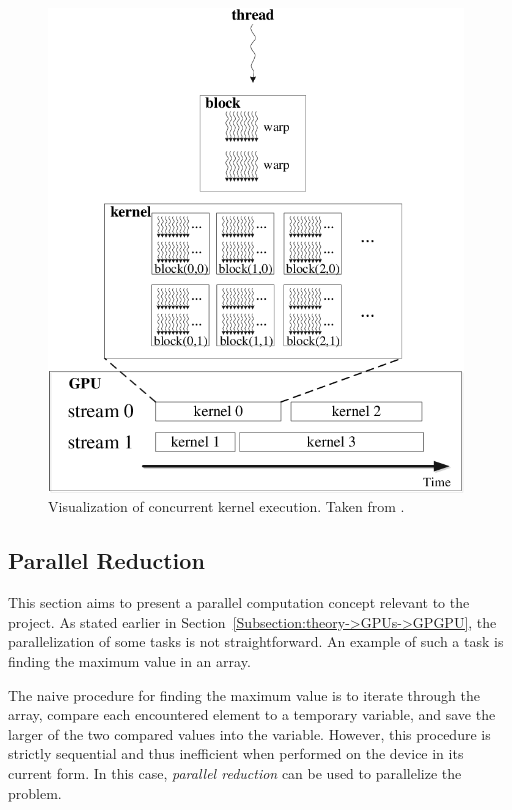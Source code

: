 \begin{figure}[ht!]
	\centering
	\includegraphics[width=11cm, keepaspectratio]{images/ch01/CUDA_concurrent_kernel_execution.png}
	\caption{Visualization of concurrent kernel execution.
		Taken from  \cite{Xu2015}.
	}
	\label{Figure:theory->CUDA->concurrent-kernel-execution->concurrent-kernel-execution-visualization}
\end{figure}

\subsection{Parallel Reduction}\label{Subsection:theory->CUDA->parallel-reduction}
This section aims to present a parallel computation concept relevant to the project.
As stated earlier in Section~\ref{Subsection:theory->GPUs->GPGPU}, the parallelization of some tasks is not straightforward.
An example of such a task is finding the maximum value in an array.

The naive procedure for finding the maximum value is to iterate through the array, compare each encountered element to a temporary variable, and save the larger of the two compared values into the variable.
However, this procedure is strictly sequential and thus inefficient when performed on the device in its current form.
In this case, \textit{parallel reduction} can be used to parallelize the problem.

